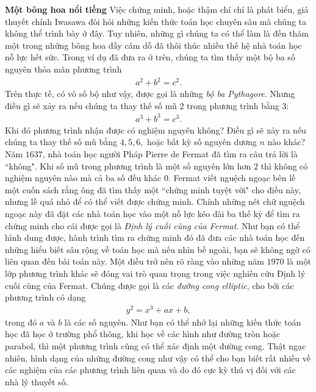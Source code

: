 \begin{multicols}{2}
	\vskip 0.05cm
	\textbf{\color{duongvaotoanhoc}Một bông hoa nổi tiếng}
	\vskip 0.05cm
	Việc chứng minh, hoặc thậm chí chỉ là phát biểu, giả thuyết chính Iwasawa đòi hỏi những kiến thức toán học chuyên sâu mà chúng ta không thể trình bày ở đây. Tuy nhiên, những gì chúng ta có thể làm là đến thăm một trong những bông hoa đầy cám dỗ đã thôi thúc nhiều thế hệ nhà toán học nỗ lực hết sức. Trong ví dụ đã đưa ra ở trên, chúng ta tìm thấy một bộ ba số nguyên thỏa mãn phương trình
	\begin{align*}
		a ^ 2 + b ^ 2 = c ^ 2.
	\end{align*}
	Trên thực tế, có vô số bộ như vậy, được gọi là những \textit{bộ ba Pythagore}.
	\vskip 0.05cm
	Nhưng điều gì sẽ xảy ra nếu chúng ta thay thế số mũ $ 2 $ trong phương trình bằng $ 3 $: 
	\begin{align*}
		a ^ 3 + b ^ 3 = c ^ 3.
	\end{align*}
	Khi đó phương trình nhận được có nghiệm nguyên không? Điều gì sẽ xảy ra nếu chúng ta thay thế số mũ bằng $ 4, 5, 6, $ hoặc bất kỳ số nguyên dương $ n $ nào khác? Năm $1637$, nhà toán học người Pháp Pierre de Fermat đã tìm ra câu trả lời là ``không". Khi số mũ trong phương trình là một số nguyên lớn hơn $ 2 $ thì không có nghiệm nguyên nào mà cả ba số đều khác $ 0 $. Fermat viết nguệch ngoạc bên lề một cuốn sách rằng ông đã tìm thấy một ``chứng minh tuyệt vời" cho điều này, nhưng lề quá nhỏ để có thể viết được chứng minh.
	\vskip 0.01cm
	Chính những nét chữ nguệch ngoạc này đã đặt các nhà toán học vào một nỗ lực kéo dài ba thế kỷ để tìm ra chứng minh cho cái được gọi là \textit{Định lý cuối cùng của Fermat}.
	\vskip 0.01cm
	Như bạn có thể hình dung được, hành trình tìm ra chứng minh đó đã đưa các nhà toán học đến những hiểu biết sâu rộng về toán học mà nếu nhìn bề ngoài, bạn sẽ không ngờ có liên quan đến bài toán này. Một điều trở nên rõ ràng vào những năm $1970$ là một lớp phương trình khác sẽ đóng vai trò quan trọng trong việc nghiên cứu Định lý cuối cùng của Fermat. Chúng được gọi là các \textit{đường cong elliptic}, cho bởi các phương trình có dạng
	\begin{align*}
		y ^ 2 = x ^ 3 + ax + b,
	\end{align*}
	trong đó $ a $ và $ b $ là các số nguyên.
	\vskip 0.01cm
	Như bạn có thể nhớ lại những kiến thức toán học đã học ở trường phổ thông, khi học về các hình như đường tròn hoặc parabol, thì một phương trình cũng có thể xác định một đường cong. Thật ngạc nhiên, hình dạng của những đường cong như vậy có thể cho bạn biết rất nhiều về các nghiệm của  các phương trình liên quan và do đó cực kỳ thú vị đối với các nhà lý thuyết số.

\end{multicols}
